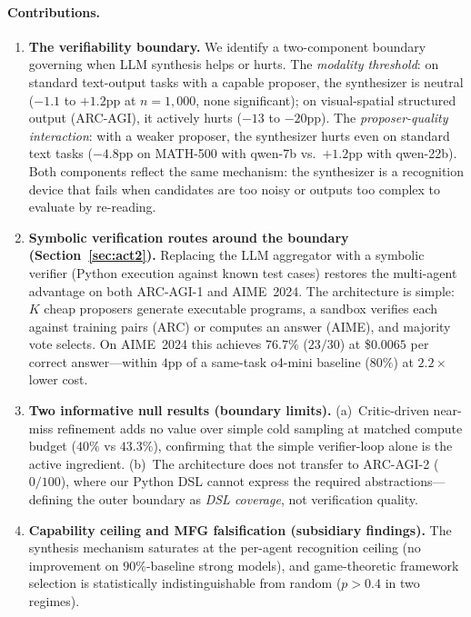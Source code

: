 \documentclass[11pt]{amsart}
\newcommand\1{{\mathds{1}}}
\theoremstyle{definition}
\theoremstyle{remark}
\numberwithin{equation}{section}
\begin{document}
\paragraph{Contributions.}
\begin{enumerate}[leftmargin=1.2em, itemsep=2pt]
\item \textbf{The verifiability boundary.}
We identify a two-component boundary governing when LLM synthesis helps or hurts.
The \emph{modality threshold}: on standard text-output tasks with a capable proposer, the synthesizer is neutral ($-1.1$ to $+1.2$pp at $n\!=\!1{,}000$, none significant); on visual-spatial structured output (ARC-AGI), it actively hurts ($-13$ to $-20$pp).
The \emph{proposer-quality interaction}: with a weaker proposer, the synthesizer hurts even on standard text tasks ($-4.8$pp on MATH-500 with qwen-7b vs.\ $+1.2$pp with qwen-22b).
Both components reflect the same mechanism: the synthesizer is a recognition device that fails when candidates are too noisy or outputs too complex to evaluate by re-reading.
\item \textbf{Symbolic verification routes around the boundary (Section~\ref{sec:act2}).}
Replacing the LLM aggregator with a symbolic verifier (Python execution against known test cases) restores the multi-agent advantage on both ARC-AGI-1 and AIME~2024.
The architecture is simple: $K$ cheap proposers generate executable programs, a sandbox verifies each against training pairs (ARC) or computes an answer (AIME), and majority vote selects.
On AIME~2024 this achieves $76.7\%$ ($23/30$) at \$$0.0065$ per correct answer---within $4$pp of a same-task o4-mini baseline ($80\%$) at $2.2\times$ lower cost.
\item \textbf{Two informative null results (boundary limits).}
(a)~Critic-driven near-miss refinement adds no value over simple cold sampling at matched compute budget ($40\%$ vs $43.3\%$), confirming that the simple verifier-loop alone is the active ingredient.
(b)~The architecture does not transfer to ARC-AGI-2 ($0/100$), where our Python DSL cannot express the required abstractions---defining the outer boundary as \emph{DSL coverage}, not verification quality.
\item \textbf{Capability ceiling and MFG falsification (subsidiary findings).}
The synthesis mechanism saturates at the per-agent recognition ceiling (no improvement on $90\%$-baseline strong models), and game-theoretic framework selection is statistically indistinguishable from random ($p > 0.4$ in two regimes).
\end{enumerate}
\end{document}
